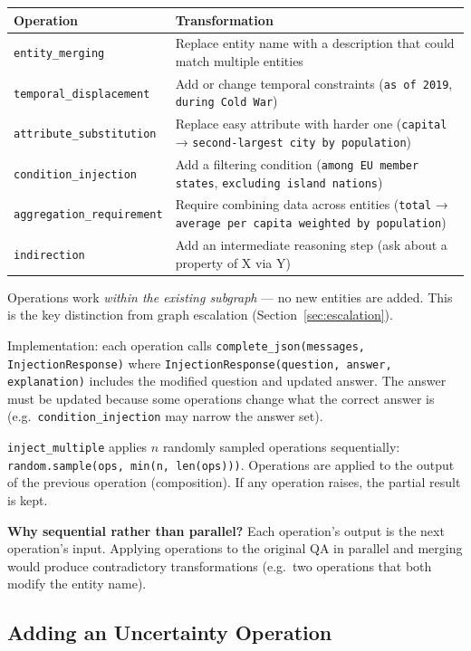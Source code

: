 \documentclass[11pt,a4paper]{article}
\begin{document}
\begin{tabular}{lp{10cm}}
\toprule
\textbf{Operation} & \textbf{Transformation} \\
\midrule
\texttt{entity\_merging} & Replace entity name with a description that could match multiple entities \\
\texttt{temporal\_displacement} & Add or change temporal constraints (\texttt{as of 2019}, \texttt{during Cold War}) \\
\texttt{attribute\_substitution} & Replace easy attribute with harder one (\texttt{capital} → \texttt{second-largest city by population}) \\
\texttt{condition\_injection} & Add a filtering condition (\texttt{among EU member states}, \texttt{excluding island nations}) \\
\texttt{aggregation\_requirement} & Require combining data across entities (\texttt{total} → \texttt{average per capita weighted by population}) \\
\texttt{indirection} & Add an intermediate reasoning step (ask about a property of X via Y) \\
\bottomrule
\end{tabular}

\vspace{0.5em}

Operations work \emph{within the existing subgraph} — no new entities are added. This is the key distinction from graph escalation (Section~\ref{sec:escalation}).

Implementation: each operation calls \texttt{complete\_json(messages, InjectionResponse)} where \texttt{InjectionResponse(question, answer, explanation)} includes the modified question and updated answer. The answer must be updated because some operations change what the correct answer is (e.g.\ \texttt{condition\_injection} may narrow the answer set).

\texttt{inject\_multiple} applies $n$ randomly sampled operations sequentially: \texttt{random.sample(ops, min(n, len(ops)))}. Operations are applied to the output of the previous operation (composition). If any operation raises, the partial result is kept.

\textbf{Why sequential rather than parallel?} Each operation's output is the next operation's input. Applying operations to the original QA in parallel and merging would produce contradictory transformations (e.g.\ two operations that both modify the entity name).

\subsection{Adding an Uncertainty Operation}
\end{document}
